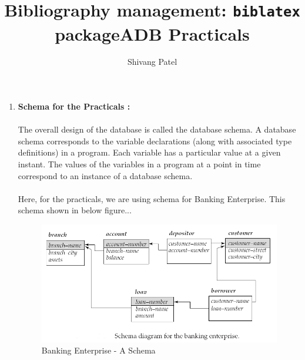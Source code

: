 \documentclass[12pt,a4paper]{report}
\title{Bibliography management: \texttt{biblatex} package}
\author{Shivang Patel}
\title{ADB Practicals}
\begin{document}
\begin{enumerate}
	\item{ \fontsize{14}{12} \textbf{Schema for the Practicals :} }{
		
		\paragraph{}{
			The overall design of the database is called the database schema. A database schema corresponds to
			the variable declarations (along with associated type definitions) in a program. Each
			variable has a particular value at a given instant. The values of the variables in a
			program at a point in time correspond to an instance of a database schema.
			}
		\paragraph{}{
			Here, for the practicals, we are using schema for Banking Enterprise. This schema shown in below figure...
			
			\begin{figure}[H]
				\centering
				\includegraphics[scale=.5]{./images/schema}
				\caption{Banking Enterprise - A Schema}
			\end{figure}
			
			}	
		
		}
\end{enumerate}		
	\clearpage
	\newpage
\end{document}

